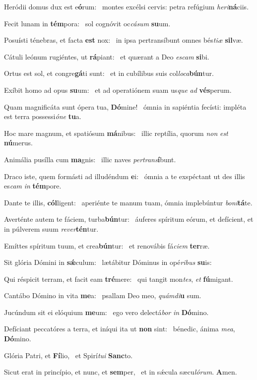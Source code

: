 \item Heródii domus dux est e\textbf{ó}rum:~\psstar{} montes excélsi cervis: petra refúgium \textit{heri}\textbf{ná}ciis.
\item Fecit lunam in \textbf{tém}pora:~\psstar{} sol cognóvit oc\textit{cásum} \textbf{su}um.
\item Posuísti ténebras, et facta \textbf{est} nox:~\psstar{} in ipsa pertransíbunt omnes bés\textit{tiæ} \textbf{sil}væ.
\item Cátuli leónum rugiéntes, ut \textbf{rá}piant:~\psstar{} et quærant a Deo \textit{escam} \textbf{si}bi.
\item Ortus est sol, et congre\textbf{gá}ti sunt:~\psstar{} et in cubílibus suis col\textit{loca}\textbf{bún}tur.
\item Exíbit homo ad opus \textbf{su}um:~\psstar{} et ad operatiónem suam us\textit{que} \textit{ad} \textbf{vés}perum.
\item Quam magnificáta sunt ópera tua, \textbf{Dó}mine!~\psstar{} ómnia in sapiéntia fecísti: impléta est terra possessi\textit{óne} \textbf{tu}a.
\item Hoc mare magnum, et spatiósum \textbf{má}nibus:~\psstar{} illic reptília, quorum \textit{non} \textit{est} \textbf{nú}merus.
\item Animália pusílla cum \textbf{ma}gnis:~\psstar{} illic naves \textit{pertrans}\textbf{í}bunt.
\item Draco iste, quem formásti ad illudéndum \textbf{e}i:~\psstar{} ómnia a te exspéctant ut des illis es\textit{cam} \textit{in} \textbf{tém}pore.
\item Dante te illis, \textbf{cól}ligent:~\psstar{} aperiénte te manum tuam, ómnia implebúntur \textit{boni}\textbf{tá}te.
\item Averténte autem te fáciem, turba\textbf{bún}tur:~\psstar{} áuferes spíritum eórum, et defícient, et in púlverem suum \textit{rever}\textbf{tén}tur.
\item Emíttes spíritum tuum, et crea\textbf{bún}tur:~\psstar{} et renovábis fá\textit{ciem} \textbf{ter}ræ.
\item Sit glória Dómini in \textbf{sǽ}culum:~\psstar{} lætábitur Dóminus in opé\textit{ribus} \textbf{su}is:
\item Qui réspicit terram, et facit eam \textbf{tré}mere:~\psstar{} qui tangit mon\textit{tes}, \textit{et} \textbf{fú}migant.
\item Cantábo Dómino in vita \textbf{me}a:~\psstar{} psallam Deo meo, \textit{quámdi}\textbf{u} sum.
\item Jucúndum sit ei elóquium \textbf{me}um:~\psstar{} ego vero delectá\textit{bor} \textit{in} \textbf{Dó}mino.
\item Defíciant peccatóres a terra, et iníqui ita ut \textbf{non} sint:~\psstar{} bénedic, ánima \textit{mea}, \textbf{Dó}mino.
\item Glória Patri, et \textbf{Fí}lio,~\psstar{} et Spirí\textit{tui} \textbf{Sanc}to.
\item Sicut erat in princípio, et nunc, et \textbf{sem}per,~\psstar{} et in sǽcula sæcu\textit{lórum}. \textbf{A}men.
